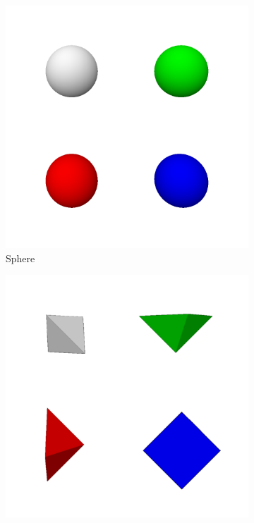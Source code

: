\documentclass{l4proj}
\begin{document}
%
\begin{figure}[H]
  \begin{subfigure}[b]{0.33\textwidth}
    \includegraphics[width=\textwidth]{images/representations/multi-sphere.png}
    \caption{Sphere}
    \label{fig:rep_multi-sphere}
  \end{subfigure}
  \begin{subfigure}[b]{0.33\textwidth}
    \includegraphics[width=\textwidth]{images/representations/multi-penta.png}

\end{subfigure}
\end{figure}
\end{document}
